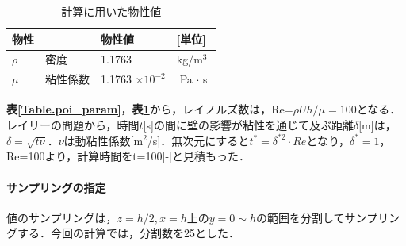 \begin{table}[htbp]
\centering
\caption{計算に用いた物性値}
\label{Table.poi_bussei}
\begin{tabular}{llll}\toprule
物性 &&物性値  & [単位]\\
\midrule
$\rho$ & 密度 & 1.1763 & kg/m$^3$\\
$\mu$  & 粘性係数 & 1.1763 $\times 10^{-2}$ &[Pa $\cdot$ s]\\
\bottomrule
\end{tabular}
\end{table}

\textbf{表\ref{Table.poi_param}}，\textbf{表\ref{Table.poi_bussei}}から，レイノルズ数は，Re=$\rho U h/\mu=100$となる．
レイリーの問題から，時間$t$[s]の間に壁の影響が粘性を通じて及ぶ距離$\delta$[m]は，$\delta=\sqrt{t\nu}$．$\nu$は動粘性係数[m$^2$/s]．無次元にすると$t^*=\delta^{*2}\cdot Re$となり，$\delta^*=1$，Re=100より，計算時間をt=100[-]と見積もった．

\paragraph{サンプリングの指定}
値のサンプリングは，$z=h/2, x=h$上の$y=0 \sim h$の範囲を分割してサンプリングする．今回の計算では，分割数を25とした．

